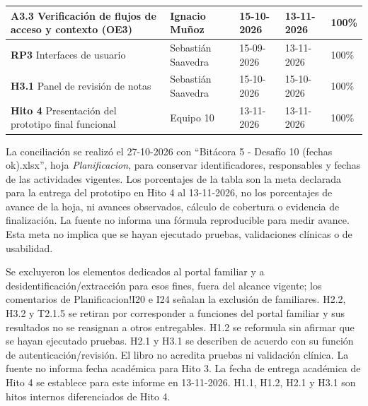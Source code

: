 \begin{table}[H]
{\begin{tabular}{|p{5.8cm}|p{2.8cm}|l|l|p{4.4cm}|}
\hline
\textbf{A3.3} Verificación de flujos de acceso y contexto (OE3) & Ignacio Muñoz & 15-10-2026 & 13-11-2026 & 100\% \\
\hline
\textbf{RP3} Interfaces de usuario & Sebastián Saavedra & 15-09-2026 & 13-11-2026 & 100\% \\
\hline
\textbf{H3.1} Panel de revisión de notas & Sebastián Saavedra & 15-10-2026 & 15-10-2026 & 100\% \\
\hline
\textbf{Hito 4} Presentación del prototipo final funcional & Equipo 10 & 13-11-2026 & 13-11-2026 & 100\% \\
\hline
\end{tabular}%
}
\end{table}

La conciliación se realizó el 27-10-2026 con ``Bitácora 5 - Desafío 10 (fechas ok).xlsx'', hoja \textit{Planificacion}, para conservar identificadores, responsables y fechas de las actividades vigentes. Los porcentajes de la tabla son la meta declarada para la entrega del prototipo en Hito 4 al 13-11-2026, no los porcentajes de avance de la hoja, ni avances observados, cálculo de cobertura o evidencia de finalización. La fuente no informa una fórmula reproducible para medir avance. Esta meta no implica que se hayan ejecutado pruebas, validaciones clínicas o de usabilidad.

Se excluyeron los elementos dedicados al portal familiar y a desidentificación/extracción para esos fines, fuera del alcance vigente; los comentarios de Planificacion!I20 e I24 señalan la exclusión de familiares. H2.2, H3.2 y T2.1.5 se retiran por corresponder a funciones del portal familiar y sus resultados no se reasignan a otros entregables. H1.2 se reformula sin afirmar que se hayan ejecutado pruebas. H2.1 y H3.1 se describen de acuerdo con su función de autenticación/revisión. El libro no acredita pruebas ni validación clínica. La fuente no informa fecha académica para Hito 3. La fecha de entrega académica de Hito 4 se establece para este informe en 13-11-2026. H1.1, H1.2, H2.1 y H3.1 son hitos internos diferenciados de Hito 4.

